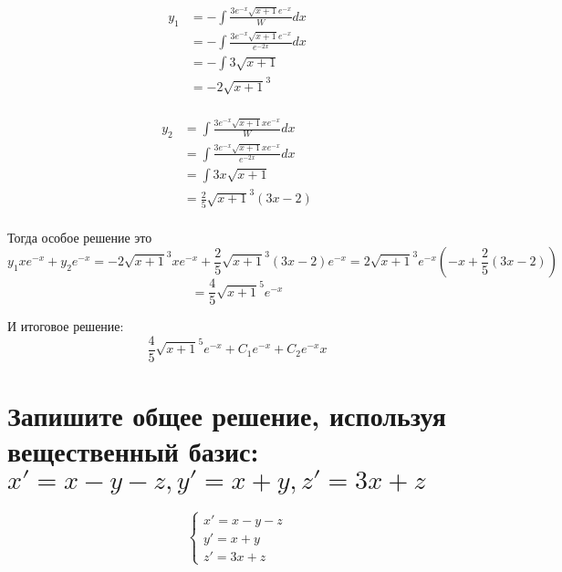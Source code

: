 \begin{align*}
    y_1 & = -\int \frac{3e^{- x}\sqrt{x + 1} e^{ - x}}{W} dx         \\
        & = -\int \frac{3e^{- x}\sqrt{x + 1} e^{ - x}}{e^{ - 2x}} dx \\
        & = -\int 3\sqrt{x + 1}                                      \\
        & = -2\sqrt{x + 1}^3                                         \\
\end{align*}

\begin{align*}
    y_2 & = \int \frac{3e^{- x}\sqrt{x + 1} xe^{ - x}}{W} dx         \\
        & = \int \frac{3e^{- x}\sqrt{x + 1} xe^{ - x}}{e^{ - 2x}} dx \\
        & = \int 3x\sqrt{x + 1}                                      \\
        & = \frac{2}{5}\sqrt{x + 1}^3(3x - 2)                        \\
\end{align*}

Тогда особое решение это
\[y_1xe^{ - x} + y_2e^{ - x} = -2\sqrt{x + 1}^3xe^{ - x} + \frac{2}{5}\sqrt{x + 1}^3(3x - 2) e^{ - x} = 2\sqrt{x + 1}^3e^{ - x}\left( - x + \frac{2}{5}(3x - 2) \right)\]
\[ = \frac{4}{5}\sqrt{x + 1}^5e^{ - x}\]

И итоговое решение:
\[\frac{4}{5}\sqrt{x + 1}^5e^{ - x} + C_1 e^{ -x} + C_2 e^{ -x} x\]

\section{Запишите общее решение, используя вещественный базис: \(x'=x-y-z, y'=x+y, z'=3x+z\)}

\[\begin{cases}
        x' = x - y - z \\
        y' = x + y     \\
        z' = 3x + z
    \end{cases}\]

